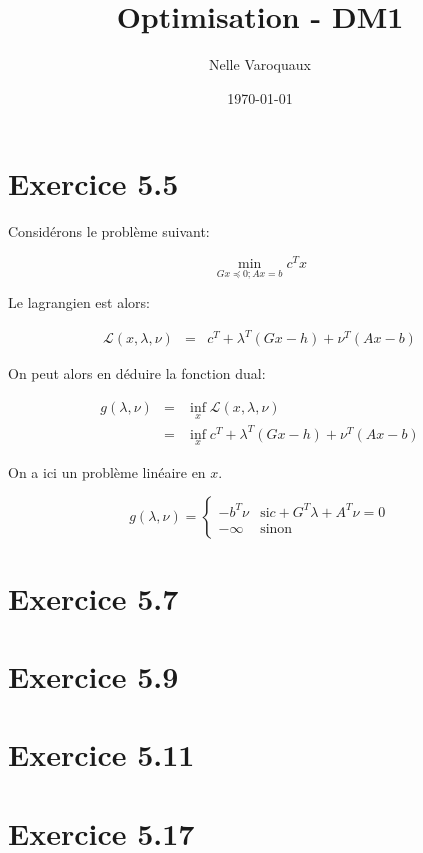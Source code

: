 \documentclass{article}
\date{\today}
\title{Optimisation - DM1}
\author{Nelle Varoquaux}
\begin{document}
\maketitle

\section{Exercice 5.5}

Considérons le problème suivant:

\begin{equation*}
\min_{G x \preccurlyeq 0; Ax = b} c^T x
\end{equation*}

Le lagrangien est alors:

\begin{align*}
\mathcal{L}(x, \lambda, \nu) & = & c^T+ \lambda^T (Gx - h) + \nu^T(Ax - b)
\end{align*}

On peut alors en déduire la fonction dual:

\begin{align*}
g(\lambda, \nu) & = & \inf_x \mathcal{L}(x, \lambda, \nu) \\
		& = & \inf_x c^T+ \lambda^T (Gx - h) + \nu^T(Ax - b)
\end{align*}

On a ici un problème linéaire en $x$.

\begin{equation*}
g(\lambda, \nu) = \begin{cases}
		  -b^T \nu & \mbox{si} c + G^T \lambda + A^T \nu = 0\\
		  - \infty & \mbox{sinon} 
		  \end{cases}
\end{equation*}
\section{Exercice 5.7}

\section{Exercice 5.9}

\section{Exercice 5.11}

\section{Exercice 5.17}
\end{document}
